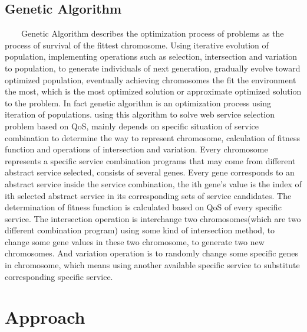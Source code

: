 \documentclass[senior,final,11pt]{iscs-thesis}
\begin{document}
\section{Genetic Algorithm}
~~~~Genetic Algorithm describes the optimization process of problems as the process of survival of the fittest chromosome.
Using iterative evolution of population, implementing operations such as selection, intersection and variation to population, to generate individuals of next generation, gradually evolve toward optimized population, eventually achieving chromosomes the fit the environment the most, which is the most optimized solution or approximate optimized solution to the problem.
In fact genetic algorithm is an optimization process using iteration of populations. \cite{zhang2007diga} using this algorithm to solve web service selection problem based on QoS, mainly depends on specific situation of service combination to determine the way to represent chromosome, calculation of fitness function and operations of intersection and variation. Every chromosome represents a specific service combination programs that may come from different abstract service selected, consists of several genes. Every gene corresponds to an abstract service inside the service combination, the ith gene’s value is the index of ith selected abstract service in its corresponding sets of service candidates. The determination of fitness function is calculated based on QoS of every specific service. The intersection operation is interchange two chromosomes(which are two different combination program) using some kind of intersection method, to change some gene values in these two chromosome, to generate two new chromosomes. And variation operation is to randomly change some specific genes in chromosome, which means using another available specific service to substitute corresponding specific service. 





\chapter{Approach}%
\end{document}
